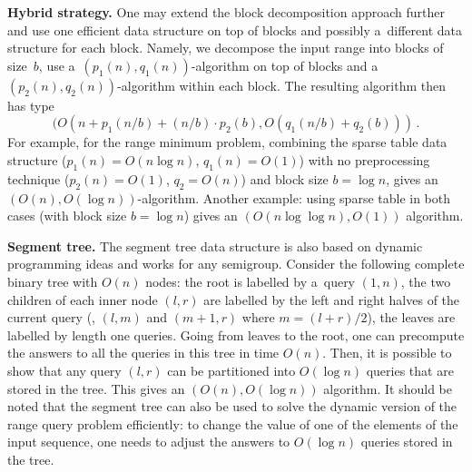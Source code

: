 \documentclass{toc}
\begin{document}
\textbf{Hybrid strategy.} One may extend the block decomposition
approach further and use one efficient data structure on top of
blocks and possibly a~different data structure for each block.
Namely, we decompose the input range into blocks of size~$b$,
use a~$(p_1(n), q_1(n))$-algorithm on top of blocks and
a~$(p_2(n), q_2(n))$-algorithm within each block. The resulting algorithm then
has type
\[(O(n + p_1(n / b) + (n / b) \cdot p_2(b), O(q_1(n/b) + q_2(b))) \, .\]
For example, for the range minimum problem, combining the sparse table data
structure ($p_1(n)=O(n\log n)$, $q_1(n)=O(1)$) with no preprocessing technique
($p_2(n)=O(1)$, $q_2=O(n)$) and block size $b=\log n$, gives
an~$(O(n), O(\log n))$-algorithm. Another example: using sparse table in both
cases (with block size $b=\log n$) gives an $(O(n\log\log n), O(1))$ algorithm.


\textbf{Segment tree.} The segment tree data structure is also based on dynamic
programming ideas and works for any semigroup. Consider the following complete
binary tree with $O(n)$ nodes: the root is labelled by a~query $(1,n)$, the two
children of each inner node $(l,r)$ are labelled by the left and right halves of
the current query (\ie, $(l,m)$ and $(m+1,r)$ where $m=(l+r)/2$), the leaves
are labelled by length one queries. Going from leaves to the root, one can
precompute the answers to all the queries in this tree in time $O(n)$. Then, it
is possible to show that any query $(l,r)$ can be  partitioned into $O(\log n)$
queries that are stored in the tree. This gives an $(O(n), O(\log n))$
algorithm. It should be noted that the segment tree can also be used to solve
the dynamic version of the 
range query
problem efficiently: to change the
value of one of the elements of the input sequence, one needs to adjust the
answers to $O(\log n)$ queries stored in the tree.
\end{document}
